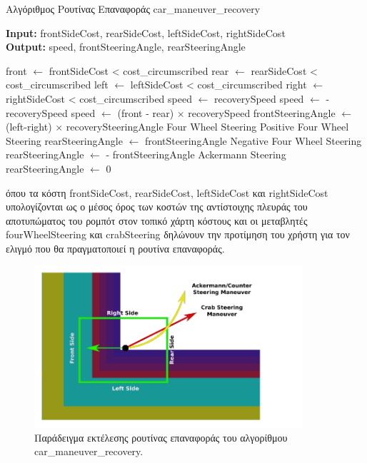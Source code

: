 \newpage
\begin{algorithm}[!ht]
	\caption{Αλγόριθμος Ρουτίνας Επαναφοράς car{\_}maneuver{\_}recovery}
	\label{alg:car_maneuver_recovery}
	\textbf{Input:} frontSideCost, rearSideCost, leftSideCost, rightSideCost\\
	\textbf{Output:} speed, frontSteeringAngle, rearSteeringAngle
	\begin{algorithmic}[1]
		\State front $\leftarrow$ frontSideCost < cost{\_}circumscribed
		\State rear  $\leftarrow$ rearSideCost < cost{\_}circumscribed
		\State left  $\leftarrow$ leftSideCost < cost{\_}circumscribed
		\State right $\leftarrow$ rightSideCost < cost{\_}circumscribed
				\State speed $\leftarrow$ recoverySpeed
			\Else
				\State speed $\leftarrow$ -recoverySpeed
			\EndIf
		\Else
			\State speed $\leftarrow$ (front - rear) $\times$ recoverySpeed
		\EndIf
		\State frontSteeringAngle $\leftarrow$ (left-right) $\times$ recoverySteeringAngle
			\Comment Four Wheel Steering
			 \Comment Positive Four Wheel Steering
				\State rearSteeringAngle $\leftarrow$ frontSteeringAngle
			\Else \Comment Negative Four Wheel Steering
				\State rearSteeringAngle $\leftarrow$ - frontSteeringAngle
			\EndIf
		\Else \Comment Ackermann Steering
			\State rearSteeringAngle $\leftarrow$ 0
		\EndIf
	\end{algorithmic}
\end{algorithm}

\bigskip
\noindent
όπου τα κόστη frontSideCost, rearSideCost, leftSideCost και rightSideCost υπολογίζονται ως ο μέσος όρος των κοστών της αντίστοιχης πλευράς του αποτυπώματος του ρομπότ στον τοπικό χάρτη κόστους και οι μεταβλητές fourWheelSteering και crabSteering δηλώνουν την προτίμηση του χρήστη για τον ελιγμό που θα πραγματοποιεί η ρουτίνα επαναφοράς.

\begin{figure}[!ht]
	\centering
	\includegraphics[height=6cm]{Chapters/Chapter4/Figures/car_maneuver_recovery_example.png}
	\caption{Παράδειγμα εκτέλεσης ρουτίνας επαναφοράς του αλγορίθμου car{\_}maneuver{\_}recovery.}
	\label{fig:car_maneuver_recovery_example}
\end{figure}


